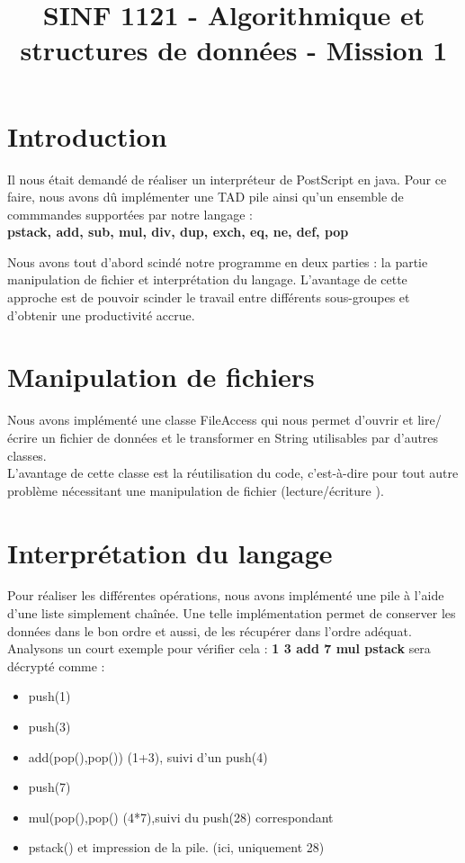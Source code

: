 \documentclass{article}
\begin{document}
\title{SINF 1121 - Algorithmique et structures de données - Mission 1}
\maketitle
\section*{Introduction}
Il nous était demandé de réaliser un interpréteur de PostScript en java. Pour ce faire, nous avons dû implémenter une TAD pile ainsi qu'un ensemble de commmandes supportées par notre langage : \\

\textbf{pstack, add, sub, mul, div, dup, exch, eq, ne, def, pop }

Nous avons tout d'abord scindé notre programme en deux parties : la partie manipulation de fichier et interprétation du langage. 
L'avantage de cette approche est de pouvoir scinder le travail entre différents sous-groupes et d'obtenir une productivité accrue.
\section*{Manipulation de fichiers}
Nous avons implémenté une classe FileAccess qui nous permet d'ouvrir et lire/écrire un fichier de données et le transformer en String utilisables par d'autres classes.\\ 
L'avantage de cette classe est la réutilisation du code, c'est-à-dire pour tout autre problème nécessitant une manipulation de fichier (lecture/écriture ).
\section*{Interprétation du langage}
Pour réaliser les différentes opérations, nous avons implémenté une pile à l'aide d'une liste simplement chaînée. Une telle implémentation permet de conserver les données dans le bon ordre et aussi, de les récupérer dans l'ordre adéquat.\\
Analysons un court exemple pour vérifier cela : 
\textbf{1 3 add 7 mul pstack} sera décrypté comme :\\
\begin{itemize}
\item push(1)
\item push(3)
\item add(pop(),pop()) (1+3), suivi d'un push(4)
\item push(7)
\item mul(pop(),pop() (4*7),suivi du push(28) correspondant
\item pstack() et impression de la pile. (ici, uniquement 28)

\end{itemize}
\end{document}
